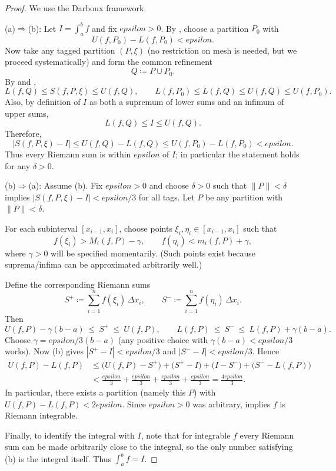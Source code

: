 \documentclass[12pt]{article}
\numberwithin{equation}{section}
\def\abs#1{|#1|}
\def\eps{epsilon}
\DeclarePairedDelimiter{\abs}{\lvert}{\rvert}
\newcommand{\eps}{\varepsilon}               %
\theoremstyle{plain}
\theoremstyle{definition}
\theoremstyle{remark}
\begin{document}
\begin{proof}
We use the Darboux framework.

(a)$\Rightarrow$(b):
Let $I=\int_a^b f$ and fix $\eps>0$.
By , choose a partition $P_0$ with
\[
U(f,P_0)-L(f,P_0)<\eps.
\]
Now take any tagged partition $(P,\xi)$ (no restriction on mesh is needed, but we proceed systematically) and form the common refinement
\[
Q \coloneqq P\cup P_0.
\]
By  and ,
\[
L(f,Q)\le S(f,P,\xi)\le U(f,Q),
\qquad
L(f,P_0)\le L(f,Q)\le U(f,Q)\le U(f,P_0).
\]
Also, by definition of $I$ as both a supremum of lower sums and an infimum of upper sums,
\[
L(f,Q)\le I \le U(f,Q).
\]
Therefore,
\[
\abs{S(f,P,\xi)-I}
\le U(f,Q)-L(f,Q)
\le U(f,P_0)-L(f,P_0)
<\eps.
\]
Thus every Riemann sum is within $\eps$ of $I$; in particular the statement holds for any $\delta>0$.

(b)$\Rightarrow$(a):
Assume (b). Fix $\eps>0$ and choose $\delta>0$ such that $\|P\|<\delta$ implies $\abs{S(f,P,\xi)-I}<\eps/3$ for all tags.
Let $P$ be any partition with $\|P\|<\delta$.

For each subinterval $[x_{i-1},x_i]$, choose points $\xi_i,\eta_i\in[x_{i-1},x_i]$ such that
\[
f(\xi_i) > M_i(f,P) - \gamma,
\qquad
f(\eta_i) < m_i(f,P) + \gamma,
\]
where $\gamma>0$ will be specified momentarily.
(Such points exist because suprema/infima can be approximated arbitrarily well.)

Define the corresponding Riemann sums
\[
S^+ \coloneqq \sum_{i=1}^n f(\xi_i)\,\Delta x_i,
\qquad
S^- \coloneqq \sum_{i=1}^n f(\eta_i)\,\Delta x_i.
\]
Then
\[
U(f,P)-\gamma(b-a)\ \le\ S^+ \ \le\ U(f,P),
\qquad
L(f,P)\ \le\ S^- \ \le\ L(f,P)+\gamma(b-a).
\]
Choose $\gamma=\eps\bigl/3(b-a)$ (any positive choice with $\gamma(b-a)<\eps/3$ works).
Now (b) gives $\abs{S^+-I}<\eps/3$ and $\abs{S^--I}<\eps/3$.
Hence
\begin{align*}
U(f,P)-L(f,P)
&\le \bigl(U(f,P)-S^+\bigr)+\bigl(S^+-I\bigr)+\bigl(I-S^-\bigr)+\bigl(S^--L(f,P)\bigr)\\
&< \frac{\eps}{3}+\frac{\eps}{3}+\frac{\eps}{3}+\frac{\eps}{3}=\frac{4\eps}{3}.
\end{align*}
In particular, there exists a partition (namely this $P$) with $U(f,P)-L(f,P)<2\eps$.
Since $\eps>0$ was arbitrary,  implies $f$ is Riemann integrable.

Finally, to identify the integral with $I$, note that for integrable $f$ every Riemann sum can be made arbitrarily close to the integral,
so the only number satisfying (b) is the integral itself. Thus $\int_a^b f = I$.
\end{proof}
\end{document}
